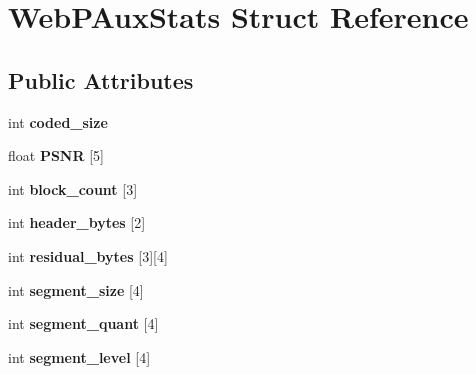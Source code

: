 \hypertarget{structWebPAuxStats}{}\section{Web\+P\+Aux\+Stats Struct Reference}
\label{structWebPAuxStats}
\subsection*{Public Attributes}
\begin{DoxyCompactItemize}
\item 
\mbox{\label{structWebPAuxStats_a845f6cb8e702c6542c5641defd1bb06b}} 
int {\bfseries coded\+\_\+size}
\item 
\mbox{\label{structWebPAuxStats_a35b59b186822117e466bfa5ca4cf6dbd}} 
float {\bfseries P\+S\+NR} \mbox{[}5\mbox{]}
\item 
\mbox{\label{structWebPAuxStats_a213ee7829a13ea6cc514de0913917102}} 
int {\bfseries block\+\_\+count} \mbox{[}3\mbox{]}
\item 
\mbox{\label{structWebPAuxStats_a5398077a14ed0ef057380f172f409ed4}} 
int {\bfseries header\+\_\+bytes} \mbox{[}2\mbox{]}
\item 
\mbox{\label{structWebPAuxStats_ab599391a9f4bd62cdf9d3eb2c97c206f}} 
int {\bfseries residual\+\_\+bytes} \mbox{[}3\mbox{]}\mbox{[}4\mbox{]}
\item 
\mbox{\label{structWebPAuxStats_a5e3ac319d5d4946abaac33efabdfedea}} 
int {\bfseries segment\+\_\+size} \mbox{[}4\mbox{]}
\item 
\mbox{\label{structWebPAuxStats_a860f12ce3dbd8a28ace5effb0b60df48}} 
int {\bfseries segment\+\_\+quant} \mbox{[}4\mbox{]}
\item 
\mbox{\label{structWebPAuxStats_a8665b35b373fc0c21043e2c2d9e54c53}} 
int {\bfseries segment\+\_\+level} \mbox{[}4\mbox{]}
\item 
\mbox{\label{structWebPAuxStats_afeeb0a0edcf5283ff687e00947e31f5b}} 

\end{DoxyCompactItemize}
